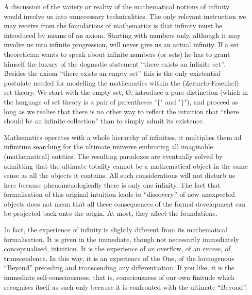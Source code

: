A discussion of the variety or reality of the mathematical notions of infinity would involve us into unnecessary technicalities. The only relevant instruction we may receive from the foundations of mathematics is that infinity must be introduced by means of an axiom. Starting with numbers only, although it may involve us into infinite progression, will never give us an actual infinity. If a set theoretician wants to speak about infinite numbers (or sets) he has to grant himself the luxury of the dogmatic statement ``there exists an infinite set''. Besides the axiom ``there exists an empty set'' this is the only existential postulate needed for modelling the mathematics within the (Zermelo-Fraenkel) set theory. We start with the empty set, \O, introduce a pure distinction (which in the language of set theory is a pair of parentheses "$\{$" and "$\}$"), and proceed as long as we realise that there is no other way to reflect the intuition that ``there should be an infinite collection'' than to simply admit its existence.

Mathematics operates with a whole hierarchy of infinities, it multiplies them ad infinitum searching for the ultimate universe embracing all imaginable (mathematical) entities. The resulting paradoxes are eventually solved by admitting that the ultimate totality cannot be a mathematical object in the same sense as all the objects it contains. All such considerations will not disturb us here because phenomenologically there is only one infinity. The fact that formalisation of this original intuition leads to ``discovery'' of new unexpected objects does not mean that all these consequences of the formal development can be projected back onto the origin. At most, they affect the foundations.

In fact, the experience of infinity is slightly different from its mathematical
formalisation. It is given in the immediate, though not necessarily immediately
conceptualised, intuition. It is the experience of an overflow, of an excess, 
of transcendence.
In this way, it is an experience of the One, of the
homogenous ``Beyond'' preceding and transcending any differentiation. If you like, it
is the immediate self-consciousness, that is, consciousness of our own finitude which 
recognises itself as such only because it is confronted with the ultimate ``Beyond''.

